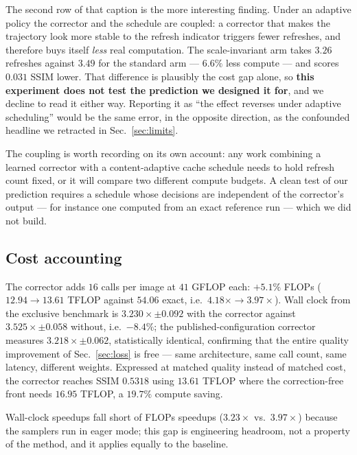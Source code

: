 The second row of that caption is the more interesting finding. Under an adaptive policy
the corrector and the schedule are coupled: a corrector that makes the trajectory look
more stable to the refresh indicator triggers fewer refreshes, and therefore buys itself
\emph{less} real computation. The scale-invariant arm takes $3.26$ refreshes against
$3.49$ for the standard arm --- $6.6\%$ less compute --- and scores $0.031$ SSIM lower.
That difference is plausibly the cost gap alone, so \textbf{this experiment does not
test the prediction we designed it for}, and we decline to read it either way. Reporting
it as ``the effect reverses under adaptive scheduling'' would be the same error, in the
opposite direction, as the confounded headline we retracted in
Sec.~\ref{sec:limits}.

The coupling is worth recording on its own account: any work combining a learned
corrector with a content-adaptive cache schedule needs to hold refresh count fixed, or
it will compare two different compute budgets. A clean test of our prediction requires a
schedule whose decisions are independent of the corrector's output --- for instance one
computed from an exact reference run --- which we did not build.

\subsection{Cost accounting}
\label{sec:cost}

The corrector adds $16$ calls per image at $41$ GFLOP each: $+5.1\%$ FLOPs
($12.94 \to 13.61$ TFLOP against $54.06$ exact, i.e.\ $4.18\times \to 3.97\times$).
Wall clock from the exclusive benchmark is $3.230\times \pm 0.092$ with the corrector
against $3.525\times \pm 0.058$ without, i.e.\ $-8.4\%$; the published-configuration
corrector measures $3.218\times \pm 0.062$, statistically identical, confirming that
the entire quality improvement of Sec.~\ref{sec:loss} is free --- same architecture,
same call count, same latency, different weights. Expressed at matched quality
instead of matched cost, the corrector reaches SSIM $0.5318$ using $13.61$ TFLOP
where the correction-free front needs $16.95$ TFLOP, a $19.7\%$ compute saving.

Wall-clock speedups fall short of FLOPs speedups ($3.23\times$ vs.\ $3.97\times$)
because the samplers run in eager mode; this gap is engineering headroom, not a
property of the method, and it applies equally to the baseline.

